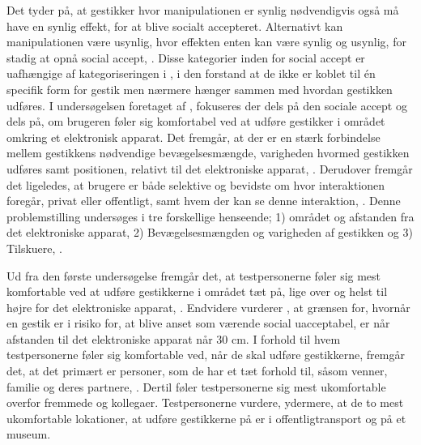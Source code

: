 Det tyder på, at gestikker hvor manipulationen er synlig nødvendigvis også må have en synlig effekt, for at blive socialt accepteret. Alternativt kan manipulationen være usynlig, hvor effekten enten kan være synlig og usynlig, for stadig at opnå social accept, \parencite[s. 278]{PDF:WouldYouDoThat}. Disse kategorier inden for social accept er uafhængige af kategoriseringen i , i den forstand at de ikke er koblet til én specifik form for gestik men nærmere hænger sammen med hvordan gestikken udføres.\blankline
I undersøgelsen foretaget af \textcite[s. 193]{PDF:AreYouComfortableDoingThat}, fokuseres der dels på den sociale accept og dels på, om brugeren føler sig komfortabel ved at udføre gestikker i området omkring et elektronisk apparat. Det fremgår, at der er en stærk forbindelse mellem gestikkens nødvendige bevægelsesmængde, varigheden hvormed gestikken udføres samt positionen, relativt til det elektroniske apparat, \parencite[s. 193]{PDF:AreYouComfortableDoingThat}. Derudover fremgår det ligeledes, at brugere er både selektive og bevidste om hvor interaktionen foregår, privat eller offentligt, samt hvem der kan se denne interaktion, \parencite[s. 193]{PDF:AreYouComfortableDoingThat}. Denne problemstilling undersøges i tre forskellige henseende; 1) området og afstanden fra det elektroniske apparat, 2) Bevægelsesmængden og varigheden af gestikken og 3) Tilskuere, \parencite[ss. 195-200]{PDF:AreYouComfortableDoingThat}. 

Ud fra den første undersøgelse fremgår det, at testpersonerne føler sig mest komfortable ved at udføre gestikkerne i området tæt på, lige over og helst til højre for det elektroniske apparat, \parencite[s. 197]{PDF:AreYouComfortableDoingThat}. Endvidere vurderer \textcite[s. 201]{PDF:AreYouComfortableDoingThat}, at grænsen for, hvornår en gestik er i risiko for, at blive anset som værende social uacceptabel, er når afstanden til det elektroniske apparat når 30 cm. I forhold til hvem testpersonerne føler sig komfortable ved, når de skal udføre gestikkerne, fremgår det, at det primært er personer, som de har et tæt forhold til, såsom venner, familie og deres partnere, \parencite[s. 196]{PDF:AreYouComfortableDoingThat}. Dertil føler testpersonerne sig mest ukomfortable overfor fremmede og kollegaer. Testpersonerne vurdere, ydermere, at de to mest ukomfortable lokationer, at udføre gestikkerne på er i offentligtransport og på et museum. 

